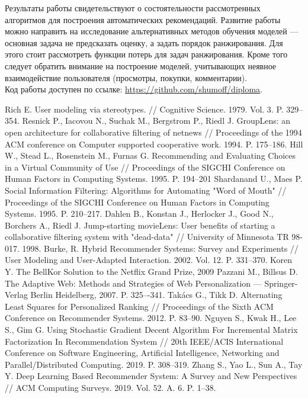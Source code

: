 \documentclass[a4paper,article,14pt]{extarticle}
\begin{document}
\pagebreak
{}
Результаты работы свидетельствуют о состоятельности рассмотренных алгоритмов для построения автоматических рекомендаций.
Развитие работы можно направить на исследование альтернативных методов обучения моделей --- основная задача не предсказать оценку, а задать порядок ранжирования.
Для этого стоит рассмотреть функции потерь для задач ранжирования.
Кроме того следует обратить внимание на построение моделей, учитывающих неявное взаимодействие пользователя (просмотры, покупки, комментарии).
\\Код работы доступен по ссылке: \url{https://github.com/shumoff/diploma}.

\pagebreak

\begin{thebibliography}{1}
 Rich E. User modeling via stereotypes. // Cognitive Science. 1979. Vol. 3. P. 329--354.
 Resnick P., Iacovou N., Suchak M., Bergstrom P., Riedl J. GroupLens: an open architecture for collaborative filtering of netnews // Proceedings of the 1994 ACM conference on Computer supported cooperative work. 1994. P. 175--186.
 Hill W., Stead L., Rosenstein M., Furnas G. Recommending and Evaluating Choices in a Virtual Community of Use // Proceedings of the SIGCHI Conference on Human Factors in Computing Systems. 1995. P. 194--201
 Shardanand U., Maes P. Social Information Filtering: Algorithms for Automating "Word of Mouth" // Proceedings of the SIGCHI Conference on Human Factors in Computing Systems. 1995. P. 210--217.
 Dahlen B., Konstan J., Herlocker J., Good N., Borchers A., Riedl J. Jump-starting movieLens: User benefits of starting a collaborative filtering system with "dead-data" // University of Minnesota TR 98-017. 1998.
 Burke, R. Hybrid Recommender Systems: Survey and Experiments // User Modeling and User-Adapted Interaction. 2002. Vol. 12. P. 331--370.
 Koren Y. The BellKor Solution to the Netflix Grand Prize, 2009
 Pazzani M., Billsus D. The Adaptive Web: Methods and Strategies of Web Personalization --- Springer-Verlag Berlin Heidelberg, 2007. P. 325–-341.
 Takács G., Tikk D. Alternating Least Squares for Personalized Ranking // Proceedings of the Sixth ACM Conference on Recommender Systems. 2012. P. 83--90.
 Nguyen S., Kwak H., Lee S., Gim G. Using Stochastic Gradient Decent Algorithm For Incremental Matrix Factorization In Recommendation System // 20th IEEE/ACIS International Conference on Software Engineering, Artificial Intelligence, Networking and Parallel/Distributed Computing. 2019. P. 308--319.
 Zhang S., Yao L., Sun A., Tay Y. Deep Learning Based Recommender System: A Survey and New Perspectives // ACM Computing Surveys. 2019. Vol. 52. A. 6. P. 1--38.


\end{thebibliography}
\end{document}
